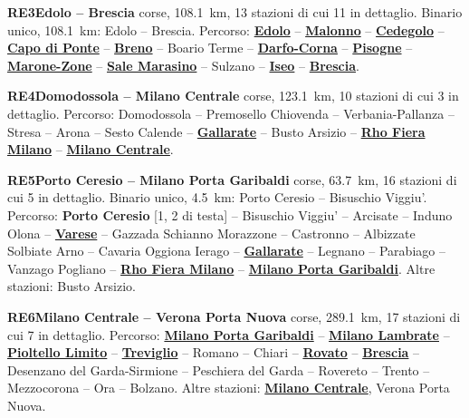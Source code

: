 \medskip\noindent\hypertarget{lin:RE3}{\textbf{RE3\enspace Edolo -- Brescia}} corse, \SI{108,1}{\km}, 13 stazioni di cui 11 in dettaglio. Binario unico, \SI{108,1}{\km}: Edolo -- Brescia. Percorso: \hyperlink{sta:S01002}{\textbf{Edolo}} -- \hyperlink{sta:S01767}{\textbf{Malonno}} -- \hyperlink{sta:S01769}{\textbf{Cedegolo}} -- \hyperlink{sta:S01771}{\textbf{Capo di Ponte}} -- \hyperlink{sta:S01005}{\textbf{Breno}} -- Boario Terme -- \hyperlink{sta:S01006}{\textbf{Darfo-Corna}} -- \hyperlink{sta:S01014}{\textbf{Pisogne}} -- \hyperlink{sta:S01783}{\textbf{Marone-Zone}} -- \hyperlink{sta:S01784}{\textbf{Sale Marasino}} -- Sulzano -- \hyperlink{sta:S01021}{\textbf{Iseo}} -- \hyperlink{sta:S09999}{\textbf{Brescia}}.

\medskip\noindent\hypertarget{lin:RE4}{\textbf{RE4\enspace Domodossola -- Milano Centrale}} corse, \SI{123,1}{\km}, 10 stazioni di cui 3 in dettaglio. Percorso: Domodossola -- Premosello Chiovenda -- Verbania-Pallanza -- Stresa -- Arona -- Sesto Calende -- \hyperlink{sta:S01030}{\textbf{Gallarate}} -- Busto Arsizio -- \hyperlink{sta:S01039}{\textbf{Rho Fiera Milano}} -- \hyperlink{sta:S01700}{\textbf{Milano Centrale}}.

\medskip\noindent\hypertarget{lin:RE5}{\textbf{RE5\enspace Porto Ceresio -- Milano Porta Garibaldi}} corse, \SI{63,7}{\km}, 16 stazioni di cui 5 in dettaglio. Binario unico, \SI{4,5}{\km}: Porto Ceresio -- Bisuschio Viggiu'. Percorso: \hypertarget{sta:S01200}{\textbf{Porto Ceresio}} [1, 2 di testa] -- Bisuschio Viggiu' -- Arcisate -- Induno Olona -- \hyperlink{sta:S01205}{\textbf{Varese}} -- Gazzada Schianno Morazzone -- Castronno -- Albizzate Solbiate Arno -- Cavaria Oggiona Ierago -- \hyperlink{sta:S01030}{\textbf{Gallarate}} -- Legnano -- Parabiago -- Vanzago Pogliano -- \hyperlink{sta:S01039}{\textbf{Rho Fiera Milano}} -- \hyperlink{sta:S01645}{\textbf{Milano Porta Garibaldi}}. Altre stazioni: Busto Arsizio.

\medskip\noindent\hypertarget{lin:RE6}{\textbf{RE6\enspace Milano Centrale -- Verona Porta Nuova}} corse, \SI{289,1}{\km}, 17 stazioni di cui 7 in dettaglio. Percorso: \hyperlink{sta:S01645}{\textbf{Milano Porta Garibaldi}} -- \hyperlink{sta:S01701}{\textbf{Milano Lambrate}} -- \hyperlink{sta:S01703}{\textbf{Pioltello Limito}} -- \hyperlink{sta:S01708}{\textbf{Treviglio}} -- Romano -- Chiari -- \hyperlink{sta:S01714}{\textbf{Rovato}} -- \hyperlink{sta:S09999}{\textbf{Brescia}} -- Desenzano del Garda-Sirmione -- Peschiera del Garda -- Rovereto -- Trento -- Mezzocorona -- Ora -- Bolzano. Altre stazioni: \hyperlink{sta:S01700}{\textbf{Milano Centrale}}, Verona Porta Nuova.

